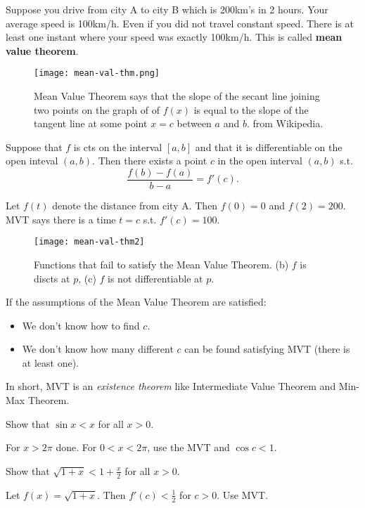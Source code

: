 \documentclass[../main.tex]{subfiles}
\begin{document}
Suppose you drive from city A to city B which is 200km's in 2 hours. Your average speed is 100km/h. Even if you did not travel constant speed. There is at least one instant where  your speed was exactly 100km/h. This is called \textbf{mean value theorem}.

\begin{figure}[htbp]
    \centering
    \texttt{[image: mean-val-thm.png]}
    \caption{Mean Value Theorem says that the slope of the secant line joining two points on the graph of of $f(x)$ is equal to the slope of the tangent line at some point $x=c$ between $a$ and $b$. from Wikipedia.}
\end{figure}

\begin{theorem}
    Suppose that $f$ is cts on the interval $[a, b]$ and that it is differentiable on the open inteval $(a, b)$. Then there exists a point $c$ in the open interval $(a, b)$ s.t.
    \[
        \frac{f(b) - f(a)}{b - a} = f'(c).
    \]
\end{theorem}

Let $f(t)$ denote the distance from city A. Then $f(0) = 0$ and $f(2) = 200$. MVT says there is a time $t = c$ s.t. $f'(c) = 100$.

\begin{figure}[htbp]
    \centering
    \texttt{[image: mean-val-thm2]}
    \caption{Functions that fail to satisfy the Mean Value Theorem. (b) $f$ is discts at $p$, (c) $f$ is not differentiable at $p$.}
\end{figure}

If the assumptions of the Mean Value Theorem are satisfied:
\begin{itemize}
    \item We don't know how to find $c$.
    \item We don't know how many different $c$ can be found satisfying MVT (there is at least one).
\end{itemize}
In short, MVT is an \textit{existence theorem} like Intermediate Value Theorem and Min-Max Theorem.

\begin{example}
    Show that $\sin x < x$ for all $x>0$.
\end{example}
\begin{solution}
    For $x > 2\pi$ done. For $0<x<2\pi$, use the MVT and $\cos c < 1$.
\end{solution}

\begin{example}
    Show that $\sqrt{1+x} < 1 + \frac{x}{2}$ for all $x>0$.
\end{example}
\begin{solution}
    Let $f(x) = \sqrt{1+x}$. Then $f'(c) < \frac{1}{2}$ for $c>0$. Use MVT.
\end{solution}
\end{document}
